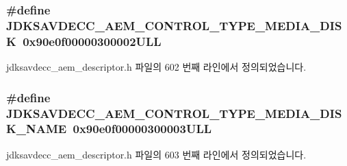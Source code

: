 \subsubsection[{\texorpdfstring{J\+D\+K\+S\+A\+V\+D\+E\+C\+C\+\_\+\+A\+E\+M\+\_\+\+C\+O\+N\+T\+R\+O\+L\+\_\+\+T\+Y\+P\+E\+\_\+\+M\+E\+D\+I\+A\+\_\+\+D\+I\+SK}{JDKSAVDECC_AEM_CONTROL_TYPE_MEDIA_DISK}}]{\setlength{\rightskip}{0pt plus 5cm}\#define J\+D\+K\+S\+A\+V\+D\+E\+C\+C\+\_\+\+A\+E\+M\+\_\+\+C\+O\+N\+T\+R\+O\+L\+\_\+\+T\+Y\+P\+E\+\_\+\+M\+E\+D\+I\+A\+\_\+\+D\+I\+SK~0x90e0f00000300002\+U\+LL}\hypertarget{group__control__type_ga88a9369b64afba907be1215de0928b30}{}\label{group__control__type_ga88a9369b64afba907be1215de0928b30}


jdksavdecc\+\_\+aem\+\_\+descriptor.\+h 파일의 602 번째 라인에서 정의되었습니다.

\subsubsection[{\texorpdfstring{J\+D\+K\+S\+A\+V\+D\+E\+C\+C\+\_\+\+A\+E\+M\+\_\+\+C\+O\+N\+T\+R\+O\+L\+\_\+\+T\+Y\+P\+E\+\_\+\+M\+E\+D\+I\+A\+\_\+\+D\+I\+S\+K\+\_\+\+N\+A\+ME}{JDKSAVDECC_AEM_CONTROL_TYPE_MEDIA_DISK_NAME}}]{\setlength{\rightskip}{0pt plus 5cm}\#define J\+D\+K\+S\+A\+V\+D\+E\+C\+C\+\_\+\+A\+E\+M\+\_\+\+C\+O\+N\+T\+R\+O\+L\+\_\+\+T\+Y\+P\+E\+\_\+\+M\+E\+D\+I\+A\+\_\+\+D\+I\+S\+K\+\_\+\+N\+A\+ME~0x90e0f00000300003\+U\+LL}\hypertarget{group__control__type_ga45814d02fe05abd4c6e24f9a5f8ae905}{}\label{group__control__type_ga45814d02fe05abd4c6e24f9a5f8ae905}


jdksavdecc\+\_\+aem\+\_\+descriptor.\+h 파일의 603 번째 라인에서 정의되었습니다.

